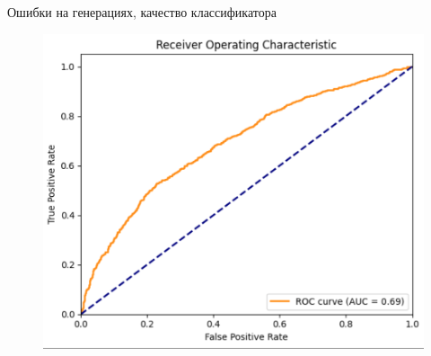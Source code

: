 \documentclass[aspectratio=169]{beamer}
\begin{document}
\begin{frame}{Ошибки на генерациях, качество классификатора}
\begin{figure}[ht]
\begin{minipage}{0.10\textwidth}
    \end{minipage}
    \hspace{30pt}
    \begin{minipage}{0.35\textwidth}
        \includegraphics[width=\linewidth]{figs/PR_ROC.png}
    \end{minipage}
\end{figure}
\end{frame}
\end{document}
